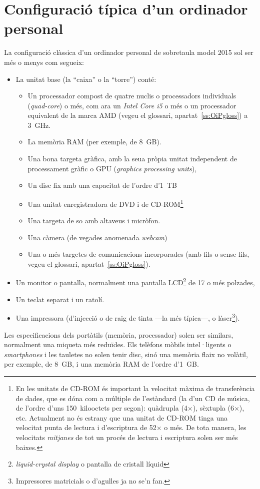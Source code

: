 \section{Configuració típica d'un ordinador personal}
La configuració clàssica d'un ordinador personal de sobretaula model
2015 sol ser més o menys com segueix:
\begin{itemize}
\item La unitat base (la ``caixa'' o la ``torre'') conté:
  \begin{itemize}
  \item Un processador compost de quatre nuclis o processadors
    individuals (\emph{quad-core}) o més, com ara un \emph{Intel Core
      i5} o més o un processador equivalent de la marca AMD (vegeu el
    glossari, apartat~\ref{ss:OiPgloss}) a 3~GHz.
  \item La memòria RAM (per exemple, de 8~GB).
  \item Una bona targeta gràfica, amb la seua pròpia unitat independent
    de processament gràfic o GPU (\emph{graphics processing units}),
  \item Un disc fix amb una capacitat de l'ordre d'1~TB
  \item Una unitat enregistradora de DVD i de CD-ROM\footnote{En les
      unitats de CD-ROM és important la velocitat màxima de
      transferència de dades, que es dóna com a múltiple de l'estàndard
      (la d'un CD de música, de l'ordre d'uns 150~kilooctets per segon):
      quàdrupla (4$\times$), sèxtupla (6$\times$), etc.  Actualment no
      és estrany que una unitat de CD-ROM tinga una velocitat punta de
      lectura i d'escriptura de 52$\times$ o més.  De tota manera, les
      velocitats \emph{mitjanes} de tot un procés de lectura i
      escriptura solen ser més baixes.}
  \item Una targeta de so amb altaveus i micròfon.
  \item Una càmera (de vegades anomenada \emph{webcam})
  \item Una o més targetes de comunicacions incorporades (amb fils o
    sense fils, vegeu el glossari, apartat~\ref{ss:OiPgloss}).
  \end{itemize}
\item Un monitor o pantalla, normalment una pantalla
  LCD\footnote{\emph{liquid-crystal display} o pantalla de cristall
    líquid} de 17 o més polzades,
\item Un teclat separat i un ratolí.
\item Una impressora (d'injecció o de raig de tinta ---la més
  típica---, o làser\footnote{Impressores matricials o d'agulles ja no
    se'n fan.}).
\end{itemize}
Les especificacions dels portàtils (memòria, processador) solen ser
similars, normalment una miqueta més reduïdes. Els telèfons mòbils
intel·ligents o \emph{smartphones} i les tauletes no solen tenir disc,
sinó una memòria flaix no volàtil, per exemple, de 8~GB, i una memòria
RAM de l'ordre d'1~GB.

